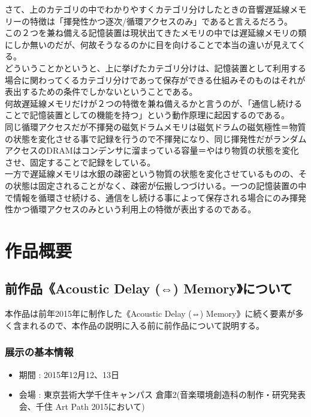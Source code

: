 \documentclass[a4paper,report]{jsbook}
\begin{document}
さて、上のカテゴリの中でわかりやすくカテゴリ分けしたときの音響遅延線メモリーの特徴は「揮発性かつ逐次/循環アクセスのみ」であると言えるだろう。\\
この２つを兼ね備える記憶装置は現状出てきたメモリの中では遅延線メモリの類にしか無いのだが、何故そうなるのかに目を向けることで本当の違いが見えてくる。\\
どういうことかというと、上に挙げたカテゴリ分けは、記憶装置として利用する場合に関わってくるカテゴリ分けであって保存ができる仕組みそのものはそれが表出するための条件でしかないということである。\\
何故遅延線メモリだけが２つの特徴を兼ね備えるかと言うのが、「通信し続けることで記憶装置としての機能を持つ」という動作原理に起因するのである。\\
同じ循環アクセスだが不揮発の磁気ドラムメモリは磁気ドラムの磁気極性＝物質の状態を変化させる事で記録を行うので不揮発になり、同じ揮発性だがランダムアクセスのDRAMはコンデンサに溜まっている容量＝やはり物質の状態を変化させ、固定することで記録をしている。\\
一方で遅延線メモリは水銀の疎密という物質の状態を変化させているものの、その状態は固定されることがなく、疎密が伝搬しつづけいる。一つの記憶装置の中で情報を循環させ続ける、通信をし続ける事によって保存される場合にのみ揮発性かつ循環アクセスのみという利用上の特徴が表出するのである。

\chapter{作品概要}\label{ux4f5cux54c1ux6982ux8981}

\section{前作品《Acoustic Delay (⇔)
Memory》について}\label{ux524dux4f5cux54c1acoustic-delay-memoryux306bux3064ux3044ux3066}

本作品は前年2015年に制作した《Acoustic Delay (⇔)
Memory》に続く要素が多く含まれるので、本作品の説明に入る前に前作品について説明する。

\subsection{展示の基本情報}\label{ux5c55ux793aux306eux57faux672cux60c5ux5831}

\begin{itemize}
\tightlist
\item
  期間 : 2015年12月12、13日
\item
  会場 : 東京芸術大学千住キャンパス
  倉庫2(音楽環境創造科の制作・研究発表会、千住 Art Path 2015において)
\end{itemize}
\end{document}
